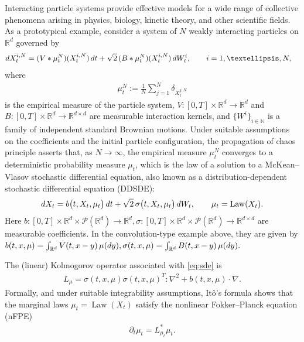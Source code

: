 \documentclass[10pt,a4paper]{amsart}
\numberwithin{equation}{section}
\def\dif{{\mathord{{\rm d}}}}
\def\dif{{\mathord{{\rm d}}}}
\begin{document}
Interacting particle systems provide effective models for a wide range of
collective phenomena arising in physics, biology, kinetic theory, and other
scientific fields. As a prototypical example, consider a system of $N$ weakly
interacting particles on $\mathbb{R}^d$ governed by
\begin{align}
\dif X_t^{i,N}
&=
(V*\mu_t^N)(X_t^{i,N})\,\dif t
+
\sqrt{2}\,
(B*\mu_t^N)(X_t^{i,N})\,\dif W_t^i,
\qquad
i=1,\ldots,N,
\notag
\end{align}
where
\begin{align*}
\mu_t^N
:=
\frac1N\sum_{j=1}^N\delta_{X_t^{j,N}}
\end{align*}
is the empirical measure of the particle system,
$V:[0,T]\times\mathbb{R}^d\to\mathbb{R}^d$ and
$B:[0,T]\times\mathbb{R}^d\to\mathbb{R}^{d\times d}$ are measurable
interaction kernels, and $\{W^i\}_{i\in\mathbb{N}}$ is a family of independent
standard   Brownian motions. 
Under suitable assumptions on the coefficients and the initial particle
configuration, the propagation of chaos principle asserts that, as
$N\to\infty$, the empirical measure $\mu_t^N$ converges to a deterministic
probability measure $\mu_t$, which is the law of a solution to a
McKean--Vlasov stochastic differential equation, also known as a
distribution-dependent stochastic differential equation (DDSDE):
\begin{align}
\dif X_t
=
b\bigl(t,X_t,\mu_t\bigr)\,\dif t
+
\sqrt{2}\,
\sigma\bigl(t,X_t,\mu_t\bigr)\,\dif W_t,
\qquad
\mu_t=\operatorname{Law}(X_t).
\label{eq:sde}
\end{align}
Here
$
b:[0,T]\times\mathbb{R}^d\times\mathcal P(\mathbb{R}^d)
\to\mathbb{R}^d,
\sigma:[0,T]\times\mathbb{R}^d\times\mathcal P(\mathbb{R}^d)
\to\mathbb{R}^{d\times d}
$
are measurable coefficients. In the convolution-type example above, they are
given by
$
b(t,x,\mu)=
\int_{\mathbb{R}^d}
V(t,x-y)\,\mu(\dif y), 
\sigma(t,x,\mu)=
\int_{\mathbb{R}^d}
B(t,x-y)\,\mu(\dif y).
$ 
 
The (linear) Kolmogorov operator associated with \eqref{eq:sde} is
\begin{align*}
L_\mu 
=
\sigma(t,x,\mu)\sigma(t,x,\mu)^T:\nabla^2
+
b(t,x,\mu)\cdot\nabla.
\end{align*}
Formally, and  under suitable integrability assumptions,
It\^o's formula shows that the marginal laws
$\mu_t=\operatorname{Law}(X_t)$ satisfy the nonlinear Fokker--Planck equation (nFPE)
\begin{align*}
\partial_t\mu_t
=
L_{\mu_t}^*\mu_t.
\end{align*} 
 
\end{document}
